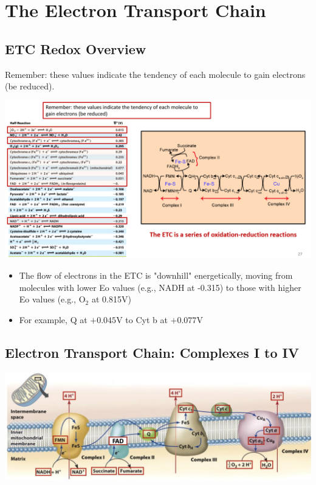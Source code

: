 \documentclass[10pt]{article}
\begin{document}
\section*{The Electron Transport Chain}
\subsection*{ETC Redox Overview}
Remember: these values indicate the tendency of each molecule to gain electrons (be reduced).
\begin{center} 
	\includegraphics*[width=\textwidth]{L2_1.png}
\end{center}
\begin{itemize}
	\item The flow of electrons in the ETC is "downhill" energetically, moving from molecules with lower Eo values (e.g., NADH at -0.315) to those with higher Eo values (e.g., O$_2$ at 0.815V)
	\item For example, Q at $+0.045$V to Cyt b at $+0.077$V
\end{itemize}

\subsection*{Electron Transport Chain: Complexes I to IV}
\begin{center} 
    \includegraphics*[width=\textwidth]{L2_2.png}
\end{center}
\end{document}
